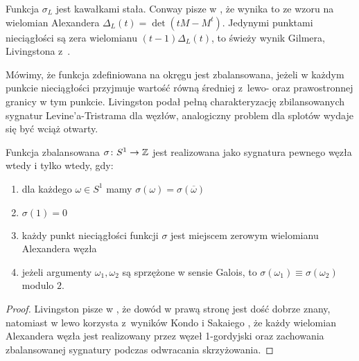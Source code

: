 Funkcja $\sigma_L$ jest kawałkami stała.
Conway pisze w \cite{conway2019}, że wynika to ze wzoru na wielomian Alexandera $\Delta_L(t) = \det(tM - M^t)$.
%
%
Jedynymi punktami nieciągłości są zera wielomianu $(t-1)\Delta_L(t)$, to świeży wynik Gilmera, Livingstona z~\cite{gilmer2016}.
%
%

Mówimy, że funkcja zdefiniowana na okręgu jest zbalansowana, jeżeli w każdym punkcie nieciągłości przyjmuje wartość równą średniej z~lewo- oraz prawostronnej granicy w tym punkcie.
Livingston podał pełną charakteryzację zbilansowanych sygnatur Levine'a-Tristrama dla węzłów, analogiczny problem dla splotów wydaje się być wciąż otwarty.

\begin{proposition}
\label{balanced_iff_four_conditions}%
    Funkcja zbalansowana $\sigma \colon S^1 \to \mathbb Z$ jest realizowana jako sygnatura pewnego węzła wtedy i tylko wtedy, gdy:
    \begin{enumerate}
        \item dla każdego $\omega \in S^1$ mamy $\sigma(\omega) = \sigma(\overline{\omega})$
        \item $\sigma(1) = 0$
        \item każdy punkt nieciągłości funkcji $\sigma$ jest miejscem zerowym wielomianu Alexandera węzła
        \item jeżeli argumenty $\omega_1, \omega_2$ są sprzężone w sensie Galois, to $\sigma(\omega_1) \equiv \sigma(\omega_2)$ modulo $2$.
    \end{enumerate}
\end{proposition}

\begin{proof}
    Livingston pisze w \cite{livingston2018}, że dowód w prawą stronę jest dość dobrze znany, natomiast w lewo korzysta z~wyników Kondo \cite{kondo1979} i Sakaiego \cite{sakai1977}, że każdy wielomian Alexandera węzła jest realizowany przez węzeł 1-gordyjski oraz zachowania zbalansowanej sygnatury podczas odwracania skrzyżowania.
\end{proof}

